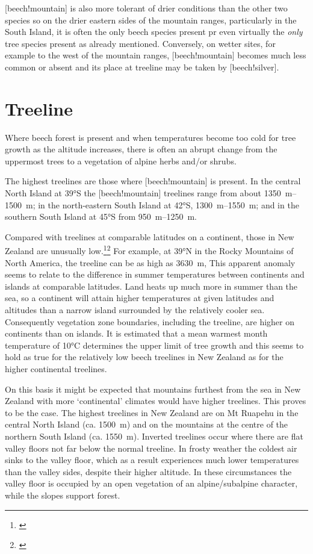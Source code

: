 [beech!mountain] is also more tolerant of drier conditions than the other two species so on the drier eastern sides of the mountain ranges, particularly in the South Island, it is often the only beech species present pr even virtually the \emph{only} tree species present as already mentioned.
Conversely, on wetter sites, for example to the west of the mountain ranges, [beech!mountain] becomes much less common or absent and its place at treeline may be taken by [beech!silver].

\section{Treeline}

Where beech forest is present and when temperatures become too cold for tree growth as the altitude increases, there is often an abrupt change from the uppermost trees to a vegetation of alpine herbs and/or shrubs.

The highest treelines are those where [beech!mountain] is present.
In the central North Island at \ang{39}S the [beech!mountain] treelines range from about \SIrange{1350}{1500}{\metre}; in the north-eastern South Island at \ang{42}S, \SIrange{1300}{1550}{\metre}; and in the southern South Island at \ang{45}S from \SIrange{950}{1250}{\metre}.

Compared with treelines at comparable latitudes on a continent, those in New Zealand are unusually low.\footnote{\cite{wardle1965comparison}}\footnote{\cite{wardle1971explanation}} For example, at \ang{39}N in the Rocky Mountains of North America, the treeline can be as high as \SI{3630}{\metre}, This apparent anomaly seems to relate to the difference in summer temperatures between continents and islands at comparable latitudes.
Land heats up much more in summer than the sea, so a continent will attain higher temperatures at given latitudes and altitudes than a narrow island surrounded by the relatively cooler sea.
Consequently vegetation zone boundaries, including the treeline, are higher on continents than on islands.
It is estimated that a mean warmest month temperature of \ang{10}C determines the upper limit of tree growth and this seems to hold as true for the relatively low beech treelines in New Zealand as for the higher continental treelines.

On this basis it might be expected that mountains furthest from the sea in New Zealand with more `continental' climates would have higher treelines.
This proves to be the case.
The highest treelines in New Zealand are on Mt Ruapehu in the central North Island (ca. \SI{1500}{\metre}) and on the mountains at the centre of the northern South Island (ca. \SI{1550}{\metre}).
Inverted treelines occur where there are flat valley floors not far below the normal treeline.
In frosty weather the coldest air sinks to the valley floor, which as a result experiences much lower temperatures than the valley sides, despite their higher altitude.
In these circumstances the valley floor is occupied by an open vegetation of an alpine/subalpine character, while the slopes support forest.


